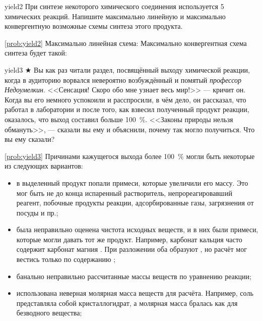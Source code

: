 \begin{problem}{}{yield2}
    При синтезе некоторого химического соединения используется 5 химических реакций. Напишите максимально линейную и максимально конвергентную возможные схемы синтеза этого продукта.
    \begin{sol}{\ref{prob:yield2}}
        Максимально линейная схема:
        Максимально конвергентная схема синтеза будет такой:
    \end{sol}
\end{problem}

\begin{problem}{}{yield3}
    $\bigstar$ Вы как раз читали раздел, посвящённый выходу химической реакции, когда в аудиторию ворвался невероятно возбуждённый и помятый \textit{профессор Недоумелкин}. <<Сенсация! Скоро обо мне узнает весь мир!>> --- кричит он. Когда вы его немного успокоили и расспросили, в чём дело, он рассказал, что работал в лаборатории и после того, как взвесил полученный продукт реакции, оказалось, что выход составил больше \qty{100}{\percent}. <<Законы природы нельзя обмануть>>, --- сказали вы ему и объяснили, почему так могло получиться. Что вы ему сказали?
    \begin{sol}{\ref{prob:yield3}}
        Причинами кажущегося выхода более \qty{100}{\percent} могли быть некоторые из следующих вариантов:
        \begin{itemize}
            \item в выделенный продукт попали примеси, которые увеличили его массу. Это мог быть не до конца испаренный растворитель, непрореагировавший реагент, побочные продукты реакции, адсорбированные газы, загрязнения от посуды и пр.;
            \item была неправильно оценена чистота исходных веществ, и в них были примеси, которые могли давать тот же продукт. Например, карбонат кальция  часто содержит карбонат магния . При разложении оба образуют , но расчёт мог вестись только по содержанию ;
            \item банально неправильно рассчитанные массы веществ по уравнению реакции;
            \item использована неверная молярная масса веществ для расчёта. Например, соль представляла собой кристаллогидрат, а молярная масса бралась как для безводного вещества;

\end{itemize}
\end{sol}
\end{problem}
